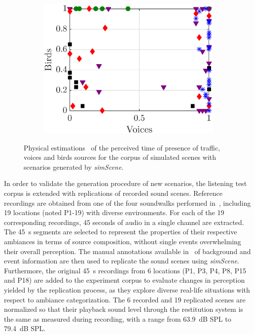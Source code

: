 \documentclass[twocolumn]{article}
\begin{document}
\begin{figure}[th]
\begin{subfigure}[t]{0.33\textwidth}
        \includegraphics[width=\textwidth]{figures/vb_pres.eps}
    \end{subfigure}
    \caption{Physical estimations~\cite{gontier2018} of the perceived time of presence of traffic, voices and birds sources for the corpus of simulated scenes with scenarios generated by \textit{simScene}.}\label{fig:tvb_pres}
\end{figure}

In order to validate the generation procedure of new scenarios, the listening test corpus is extended with replications of recorded sound scenes. Reference recordings are obtained from one of the four soundwalks performed in~\cite{aumond2017}, including 19 locations (noted P1-19) with diverse environments. For each of the 19 corresponding recordings, 45 seconds of audio in a single channel are extracted. The 45~s segments are selected to represent the properties of their respective ambiances in terms of source composition, without single events overwhelming their overall perception. The manual annotations available in~\cite{gloaguen2017} of background and event information are then used to replicate the sound scenes using \textit{simScene}. Furthermore, the original 45~s recordings from 6 locations (P1, P3, P4, P8, P15 and P18) are added to the experiment corpus to evaluate changes in perception yielded by the replication process, as they explore diverse real-life situations with respect to ambiance categorization. The 6 recorded and 19 replicated scenes are normalized so that their playback sound level through the restitution system is the same as measured during recording, with a range from 63.9~dB SPL to 79.4~dB SPL.\\
\end{document}
